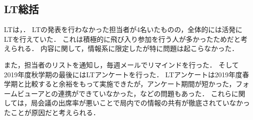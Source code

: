 \subsection*{LT総括}

LTは，．
LTの発表を行わなかった担当者が4名いたものの，全体的には活発にLTを行えていた．
これは積極的に飛び入り参加を行う人が多かったためだと考えられる．
内容に関して，情報系に限定したが特に問題は起こらなかった．

また，担当者のリストを通知し，毎週メールでリマインドを行った．
そして2019年度秋学期の最後にはLTアンケートを行った．
LTアンケートは2019年度春学期と比較すると余裕をもって実施できたが，アンケート期間が短かった，フォームビューアとの連携ができていなかった，などの問題もあった．
これらに関しては，局会議の出席率が悪いことで局内での情報の共有が徹底されていなかったことが原因だと考えられる．
